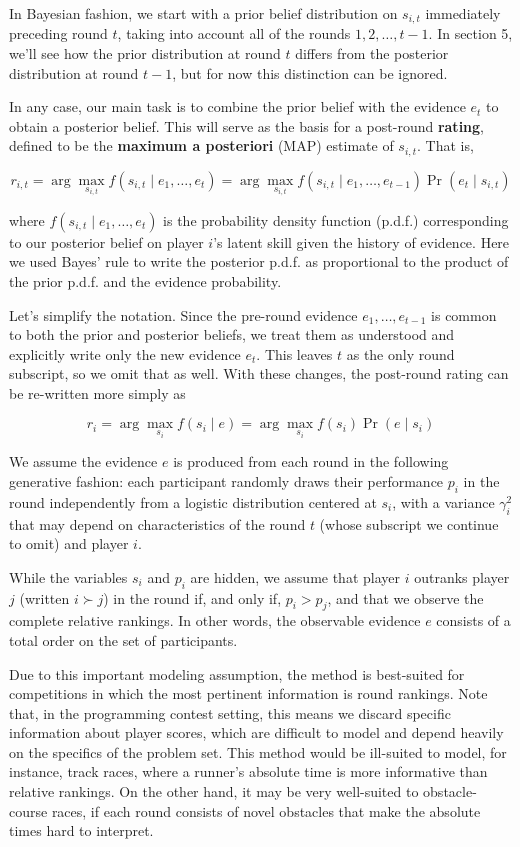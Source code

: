 \documentclass{article}
\begin{document}
In Bayesian fashion, we start with a prior belief distribution on $s_{i,t}$ immediately preceding round $t$, taking into account all of the rounds $1,2,\ldots,t-1$. In section 5, we'll see how the prior distribution at round $t$ differs from the posterior distribution at round $t-1$, but for now this distinction can be ignored.

In any case, our main task is to combine the prior belief with the evidence $e_t$ to obtain a posterior belief. This will serve as the basis for a post-round \textbf{rating}, defined to be the \textbf{maximum a posteriori} (MAP) estimate of $s_{i,t}$. That is,

\[r_{i,t} = \arg\max_{s_{i,t}} f(s_{i,t} \mid e_1,\ldots,e_t)
= \arg\max_{s_{i,t}} f(s_{i,t} \mid e_1,\ldots,e_{t-1}) \Pr(e_t \mid s_{i,t})\]

where $f(s_{i,t} \mid e_1,\ldots,e_t)$ is the probability density function (p.d.f.) corresponding to our posterior belief on player $i$'s latent skill given the history of evidence. Here we used Bayes' rule to write the posterior p.d.f. as proportional to the product of the prior p.d.f. and the evidence probability.

Let's simplify the notation. Since the pre-round evidence $e_1,\ldots,e_{t-1}$ is common to both the prior and posterior beliefs, we treat them as understood and explicitly write only the new evidence $e_t$. This leaves $t$ as the only round subscript, so we omit that as well. With these changes, the post-round rating can be re-written more simply as

\[r_i = \arg\max_{s_i} f(s_i \mid e) = \arg\max_{s_i} f(s_i) \Pr(e \mid s_i)\]

We assume the evidence $e$ is produced from each round in the following generative fashion: each participant randomly draws their performance $p_i$ in the round independently from a logistic distribution centered at $s_i$, with a variance $\gamma_i^2$ that may depend on characteristics of the round $t$ (whose subscript we continue to omit) and player $i$.

While the variables $s_i$ and $p_i$ are hidden, we assume that player $i$ outranks player $j$ (written $i \succ j$) in the round if, and only if, $p_i > p_j$, and that we observe the complete relative rankings. In other words, the observable evidence $e$ consists of a total order on the set of participants.

Due to this important modeling assumption, the method is best-suited for competitions in which the most pertinent information is round rankings. Note that, in the programming contest setting, this means we discard specific information about player scores, which are difficult to model and depend heavily on the specifics of the problem set. This method would be ill-suited to model, for instance, track races, where a runner's absolute time is more informative than relative rankings. On the other hand, it may be very well-suited to obstacle-course races, if each round consists of novel obstacles that make the absolute times hard to interpret.
\end{document}
